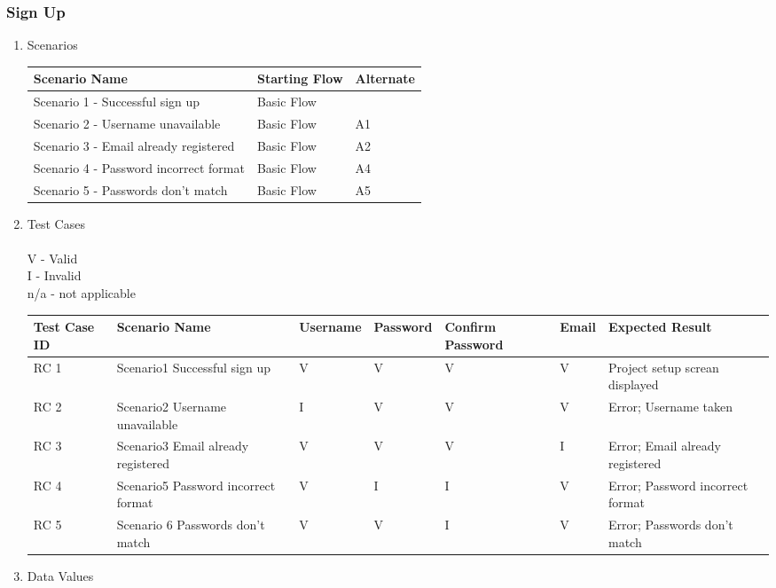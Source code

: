 \documentclass[hidelinks, 12pt, oneside]{article}
\begin{document}
\subsubsection{Sign Up}
\begin{enumerate}
\item Scenarios

\begin{center}
 \begin{tabu}to 0.8\textwidth{|X[l]| X|X|} 
 \hline
 Scenario Name & Starting Flow & Alternate \\ [1ex]
 \hline
 Scenario 1 - Successful sign up & Basic Flow &\\ [1ex]
 \hline
Scenario 2 - Username unavailable & Basic Flow & A1  \\[1ex]
 \hline
 Scenario 3 - Email already registered & Basic Flow & A2  \\[1ex]
 \hline
 Scenario 4 - Password incorrect format & Basic Flow & A4  \\ [1ex] 
 \hline
 Scenario 5 - Passwords don't match & Basic Flow & A5  \\ [1ex] 
 \hline
\end{tabu}
\end{center}

\item Test Cases\\
\\V - Valid\\ I - Invalid\\ n/a - not applicable
\begin{center}
\begin{tabu}to 1.1\textwidth{|X[l]|X|X|X|X|X|X|} 
 \hline
 Test Case ID & Scenario Name & Username & Password & Confirm Password & Email & Expected Result \\ [0.1ex]
 \hline
  RC 1 & Scenario1 Successful sign up & V & V & V & V & Project setup screan displayed\\ [0.1ex]
 \hline
 RC 2 & Scenario2 Username unavailable & I&V&V&V&Error; Username taken \\[0.1ex]
 \hline
  RC 3 & Scenario3 Email already registered & V&V&V&I&Error; Email already registered\\[0.1ex]
 \hline
 RC 4 &  Scenario5 Password incorrect format & V&I&I&V&Error; Password incorrect format\\[0.1ex]
 \hline
 RC 5 &  Scenario 6 Passwords don't match & V&V&I&V&Error; Passwords don't match  \\ [0.1ex]
 \hline
\end{tabu}
\end{center}


\item Data Values
\end{enumerate}
\end{document}
